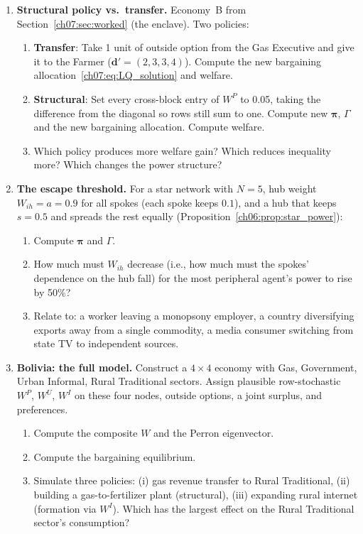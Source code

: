 \documentclass[../structural_economics_book.tex]{subfiles}
\begin{document}
\begin{enumerate}[label=\textbf{7.\arabic*}, leftmargin=3em]
\item \textbf{Structural policy vs.\ transfer.} Economy~B from Section~\ref{ch07:sec:worked} (the enclave). Two policies:
\begin{enumerate}
\item \textbf{Transfer}: Take 1 unit of outside option from the Gas Executive and give it to the Farmer ($\boldsymbol{d}' = (2, 3, 3, 4)$). Compute the new bargaining allocation~\eqref{ch07:eq:LQ_solution} and welfare.
\item \textbf{Structural}: Set every cross-block entry of $W^P$ to 0.05, taking the difference from the diagonal so rows still sum to one. Compute new $\boldsymbol{\pi}$, $\Gamma$ and the new bargaining allocation. Compute welfare.
\item Which policy produces more welfare gain? Which reduces inequality more? Which changes the power structure?
\end{enumerate}

\item \textbf{The escape threshold.} For a star network with $N = 5$, hub weight $W_{ih} = a = 0.9$ for all spokes (each spoke keeps $0.1$), and a hub that keeps $s = 0.5$ and spreads the rest equally (Proposition~\ref{ch06:prop:star_power}):
\begin{enumerate}
\item Compute $\boldsymbol{\pi}$ and $\Gamma$.
\item How much must $W_{ih}$ decrease (i.e., how much must the spokes' dependence on the hub fall) for the most peripheral agent's power to rise by 50\%?
\item Relate to: a worker leaving a monopsony employer, a country diversifying exports away from a single commodity, a media consumer switching from state TV to independent sources.
\end{enumerate}

\item \textbf{Bolivia: the full model.} Construct a $4 \times 4$ economy with Gas, Government, Urban Informal, Rural Traditional sectors. Assign plausible row-stochastic $W^P$, $W^U$, $W^I$ on these four nodes, outside options, a joint surplus, and preferences.
\begin{enumerate}
\item Compute the composite $W$ and the Perron eigenvector.
\item Compute the bargaining equilibrium.
\item Simulate three policies: (i) gas revenue transfer to Rural Traditional, (ii) building a gas-to-fertilizer plant (structural), (iii) expanding rural internet (formation via $W^I$). Which has the largest effect on the Rural Traditional sector's consumption?
\end{enumerate}


\end{enumerate}
\end{document}
